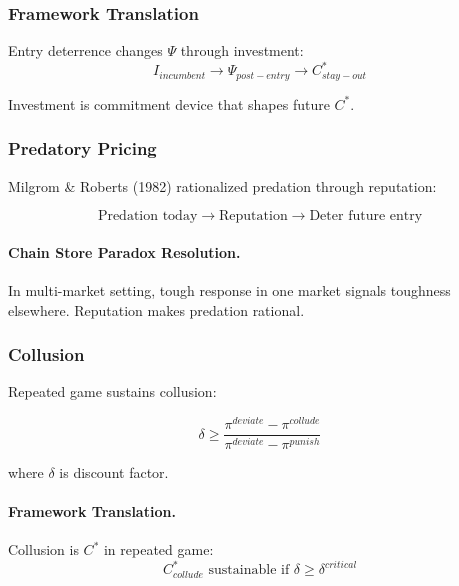 \subsubsection{Framework Translation}

Entry deterrence changes $\Psi$ through investment:
\begin{equation}
I_{incumbent} \to \Psi_{post-entry} \to C^*_{stay-out}
\end{equation}

Investment is commitment device that shapes future $C^*$.

\subsubsection{Predatory Pricing}

Milgrom \& Roberts (1982) rationalized predation through reputation:

\begin{equation}
\boxed{
\text{Predation today} \to \text{Reputation} \to \text{Deter future entry}
}
\label{eq:predation}
\end{equation}

\paragraph{Chain Store Paradox Resolution.}
In multi-market setting, tough response in one market signals toughness 
elsewhere. Reputation makes predation rational.

\subsubsection{Collusion}

Repeated game sustains collusion:

\begin{equation}
\boxed{
\delta \geq \frac{\pi^{deviate} - \pi^{collude}}{\pi^{deviate} - \pi^{punish}}
}
\label{eq:collusion}
\end{equation}

where $\delta$ is discount factor.

\paragraph{Framework Translation.}
Collusion is $C^*$ in repeated game:
\begin{equation}
C^*_{collude} \text{ sustainable if } \delta \geq \delta^{critical}
\end{equation}

